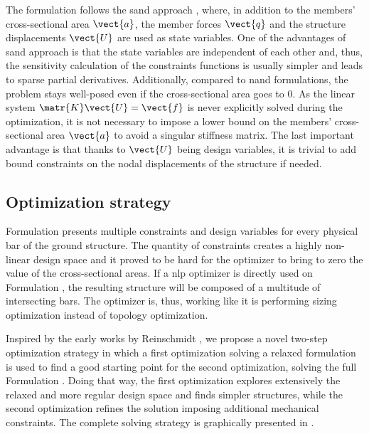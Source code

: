 The formulation follows the \gls{sand} approach , where, in addition to the members' cross-sectional area $\vect{a}$, the member forces $\vect{q}$ and the structure displacements $\vect{U}$ are used as state variables. One of the advantages of \gls{sand} approach is that the state variables are independent of each other and, thus, the sensitivity calculation of the constraints functions is usually simpler and leads to sparse partial derivatives. Additionally, compared to \gls{nand} formulations, the problem stays well-posed even if the cross-sectional area goes to 0. As the linear system $\matr{K}\vect{U}=\vect{f}$ is never explicitly solved during the optimization, it is not necessary to impose a lower bound on the members' cross-sectional area $\vect{a}$ to avoid a singular stiffness matrix. The last important advantage is that thanks to $\vect{U}$ being design variables, it is trivial to add bound constraints on the nodal displacements of the structure if needed.

\subsection{Optimization strategy} \label{sec:04_2step_opt}
Formulation  presents multiple constraints and design variables for every physical bar of the ground structure. The quantity of constraints creates a highly non-linear design space and it proved to be hard for the optimizer to bring to zero the value of the cross-sectional areas. If a \gls{nlp} optimizer is directly used on Formulation , the resulting structure will be composed of a multitude of intersecting bars. The optimizer is, thus, working like it is performing sizing optimization instead of topology optimization. 

Inspired by the early works by Reinschmidt , we propose a novel two-step optimization strategy in which a first optimization solving a relaxed formulation is used to find a good starting point for the second optimization, solving the full Formulation . Doing that way, the first optimization explores extensively the relaxed and more regular design space and finds simpler structures, while the second optimization refines the solution imposing additional mechanical constraints. The complete solving strategy is graphically presented in .

